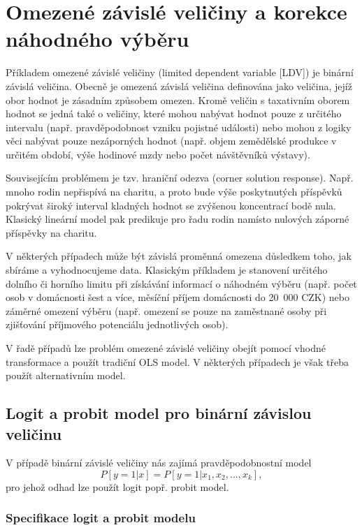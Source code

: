 \chapter{Omezené závislé veličiny a korekce náhodného výběru}

Příkladem omezené závislé veličiny (limited dependent variable [LDV]) je binární závislá veličina. Obecně je omezená závislá veličina definována jako veličina, jejíž obor hodnot je zásadním způsobem omezen. Kromě veličin s taxativním oborem hodnot se jedná také o veličiny, které mohou nabývat hodnot pouze z určitého intervalu (např. pravděpodobnost vzniku pojistné události) nebo mohou z logiky věci nabývat pouze nezáporných hodnot (např. objem zemědělské produkce v určitém období, výše hodinové mzdy nebo počet návštěvníků výstavy).

Souvisejícím problémem je tzv. hraniční odezva (corner solution response). Např. mnoho rodin nepřispívá na charitu, a proto bude výše poskytnutých příspěvků pokrývat široký interval kladných hodnot se zvýšenou koncentrací bodě nula. Klasický lineární model pak predikuje pro řadu rodin namísto nulových záporné příspěvky na charitu.

V některých případech může být závislá proměnná omezena důsledkem toho, jak sbíráme a vyhodnocujeme data. Klasickým příkladem je stanovení určitého dolního či horního limitu při získávání informací o náhodném výběru (např. počet osob v domácnosti šest a více, měsíční příjem domácnosti do 20~000 CZK) nebo záměrné omezení výběru (např. omezení se pouze na zaměstnané osoby při zjišťování příjmového potenciálu jednotlivých osob). 

V řadě případů lze problém omezené závislé veličiny obejít pomocí vhodné transformace a použít tradiční OLS model. V některých případech je však třeba použít alternativním model.

\section{Logit a probit model pro binární závislou veličinu}

V případě binární závislé veličiny nás zajímá pravděpodobnostní model
\begin{equation}
P[y = 1 |x] = P[y = 1 | x_1, x_2, ..., x_k],
\end{equation}
pro jehož odhad lze použít logit popř. probit model.

\subsection{Specifikace logit a probit modelu}

